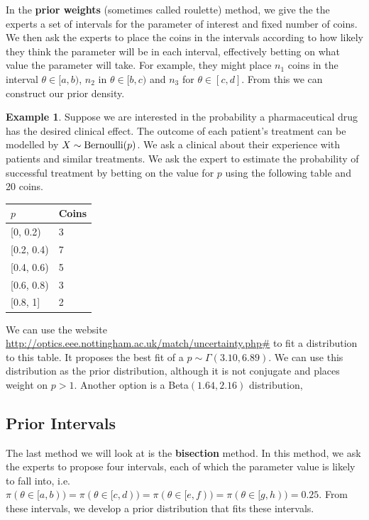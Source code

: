 \documentclass[
]{book}
\theoremstyle{definition}
\theoremstyle{definition}
\newtheorem{example}{Example}[chapter]
\theoremstyle{definition}
\theoremstyle{definition}
\theoremstyle{remark}
\begin{document}
In the \textbf{prior weights} (sometimes called roulette) method, we give the the experts a set of intervals for the parameter of interest and fixed number of coins. We then ask the experts to place the coins in the intervals according to how likely they think the parameter will be in each interval, effectively betting on what value the parameter will take. For example, they might place \(n_1\) coins in the interval \(\theta \in [a, b)\), \(n_2\) in \(\theta \in [b, c)\) and \(n_3\) for \(\theta \in [c, d]\). From this we can construct our prior density.

\begin{example}
Suppose we are interested in the probability a pharmaceutical drug has the desired clinical effect. The outcome of each patient's treatment can be modelled by \(X\sim\hbox{Bernoulli}(p)\). We ask a clinical about their experience with patients and similar treatments. We ask the expert to estimate the probability of successful treatment by betting on the value for \(p\) using the following table and 20 coins.

\begin{longtable}[]{@{}ll@{}}
\toprule\noalign{}
\(p\) & Coins \\
\midrule\noalign{}
\endhead
\bottomrule\noalign{}
\endlastfoot
{[}0, 0.2) & 3 \\
{[}0.2, 0.4) & 7 \\
{[}0.4, 0.6) & 5 \\
{[}0.6, 0.8) & 3 \\
{[}0.8, 1{]} & 2 \\
\end{longtable}

We can use the website \url{http://optics.eee.nottingham.ac.uk/match/uncertainty.php\#} to fit a distribution to this table. It proposes the best fit of a \(p \sim \Gamma(3.10, 6.89)\). We can use this distribution as the prior distribution, although it is not conjugate and places weight on \(p > 1\). Another option is a Beta\((1.64, 2.16)\) distribution,
\end{example}

\hypertarget{prior-intervals}{%
\subsection{Prior Intervals}\label{prior-intervals}}

The last method we will look at is the \textbf{bisection} method. In this method, we ask the experts to propose four intervals, each of which the parameter value is likely to fall into, i.e.~\(\pi(\theta \in [a, b)) = \pi(\theta \in [c, d)) = \pi(\theta \in [e, f))= \pi(\theta \in [g, h)) = 0.25\). From these intervals, we develop a prior distribution that fits these intervals.
\end{document}
